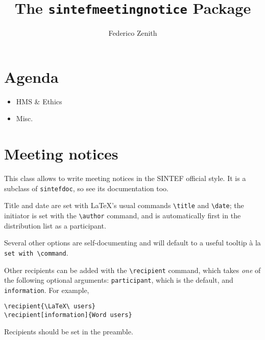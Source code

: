 \documentclass[unrestricted]{sintefmeetingnotice}
\title{The \texttt{sintefmeetingnotice} Package}
\author{Federico Zenith}
\begin{document}
\frontmatter

\section*{Agenda}
\begin{itemize}
  \item HMS \& Ethics
  \item Misc.
\end{itemize}

\section*{Meeting notices}
This class allows to write meeting notices in the SINTEF official style.
It is a subclass of \texttt{sintefdoc}, so see its documentation too.

Title and date are set with \LaTeX's usual commands \verb|\title| and
\verb|\date|; the initiator is set with the \verb|\author| command, and is
automatically first in the distribution list as a participant.

Several other options are self-documenting and will default to a useful
tooltip à la \texttt{set with \textbackslash command}.

Other recipients can be added with the \verb|\recipient| command, which
takes \emph{one} of the following optional arguments: \verb|participant|, which
is the default, and \verb|information|.
For example,
\begin{verbatim}
\recipient{\LaTeX\ users}
\recipient[information]{Word users}
\end{verbatim}
Recipients should be set in the preamble.
\end{document}
